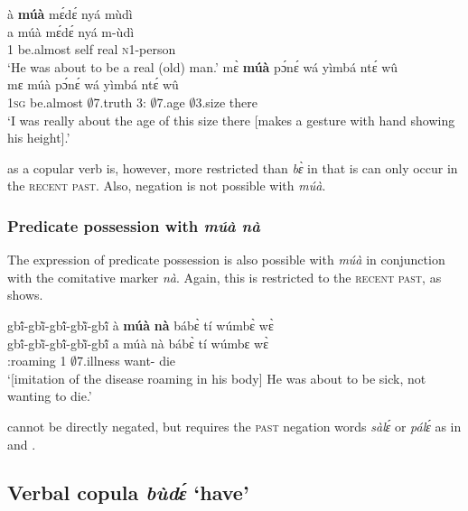 \ea \label{bemua1}
  \glll  à {\bfseries múà} mɛ́dɛ́ nyá mùdì \\
          a múà mɛ́dɛ́ nyá m-ùdì   \\
         1 be.almost  self real \textsc{n}1-person\\
    \trans `He was about to be a real (old) man.'
\ex \label{bemua2}
  \glll mɛ̀ {\bfseries múà} pɔ́nɛ́ wá yìmbá ntɛ́ wû \\
          mɛ múà pɔ́nɛ́ wá yìmbá ntɛ́ wû       \\
         1\textsc{sg} be.almost $\emptyset$7.truth 3:{\ATT} $\emptyset$7.age $\emptyset$3.size there\\
    \trans `I was really about the age of this size there [makes a gesture with hand showing his height].'
\z

 as a copular verb is, however, more restricted than {\itshape bɛ̀} in that is can only occur in the \textsc{recent past}. Also, negation is not possible with {\itshape múà}.


\subsubsection*{Predicate possession with {\itshape múà nà}}
The expression of predicate possession is also possible with {\itshape múà} in conjunction with the comitative marker {\itshape nà}. Again, this is restricted to the \textsc{recent past}, as  shows.


\ea \label{muana}
  \glll  gbĩ́-gbĩ̀-gbĩ́-gbĩ̀-gbĩ́   à {\bfseries múà} {\bfseries nà} bábɛ̀ tí wúmbɛ̀ wɛ̀ \\
            gbĩ́-gbĩ̀-gbĩ́-gbĩ̀-gbĩ́  a múà nà bábɛ̀ tí wúmbɛ wɛ̀   \\
         {\IDEO}:roaming 1 {\PROSP} {\COM} $\emptyset$7.illness {\NEG} want-{\R} die\\
    \trans `[imitation of the disease roaming in his body] He was about to be sick, not wanting to die.'
\z

 cannot be directly negated, but requires the \textsc{past} negation words {\itshape sàlɛ́} or {\itshape pálɛ́} as in  and .









\subsection{Verbal copula {\itshape bùdɛ́} `have'}
\label{sec:COPbude}

